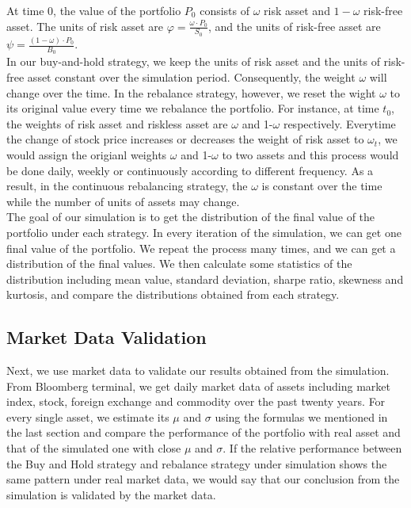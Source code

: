 \documentclass[
10pt, %
a4paper, %
oneside, %
headinclude,footinclude, %
BCOR5mm, %
]{scrartcl}
\begin{document}
At time 0, the value of the portfolio $P_0$ consists of $\omega$ risk asset and $1-\omega$ risk-free asset. The units of risk asset are $\varphi = \frac{\omega\cdot P_0}{S_0} $, and the units of risk-free asset are $\psi =  \frac{(1-\omega)\cdot P_0}{B_0}$. \\

In our buy-and-hold strategy, we keep the units of risk asset and the units of risk-free asset constant over the simulation period. Consequently, the weight $\omega$ will change over the time. In the rebalance strategy, however, we reset the wight $\omega$ to its original value every time we rebalance the portfolio. For instance, at time $t_0$, the weights of risk asset and riskless asset are $\omega$ and 1-$\omega$ respectively. Everytime the change of stock price increases or decreases the weight of risk asset to $\omega_t$, we would assign the origianl weights $\omega$ and 1-$\omega$ to two assets and this process would be done daily, weekly or continuously according to different frequency.  As a result, in the continuous rebalancing strategy, the $\omega$ is constant over the time while the number of units of assets may change.\\

The goal of our simulation is to get the distribution of the final value of the portfolio under each strategy. In every iteration of the simulation, we can get one final value of the portfolio. We repeat the process many times, and we can get a distribution of the final values. We then calculate some statistics of the distribution including mean value, standard deviation, sharpe ratio, skewness and kurtosis, and compare the distributions obtained from each strategy.\\
\subsection{Market Data Validation}
Next, we use market data to validate our results obtained from the simulation.\\

From Bloomberg terminal, we get daily market data of assets including market index, stock, foreign exchange and commodity over the past twenty years. For every single asset, we estimate its $\mu$ and $\sigma$ using the formulas we mentioned in the last section and compare the performance of the portfolio with real asset and that of the simulated one with close $\mu$ and $\sigma$. If the relative performance between the Buy and Hold strategy and rebalance strategy under simulation shows the same pattern under real market data, we would say that our conclusion from the simulation is validated by the market data. \\
\end{document}
